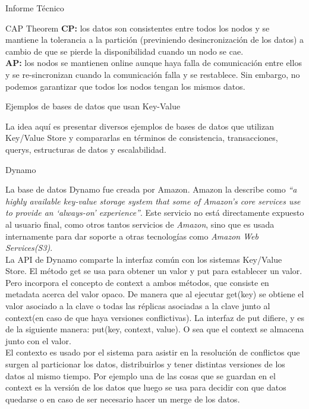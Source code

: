 \begin{section}{Informe T\'ecnico}
\begin{subsection}{CAP Theorem}
\textbf{CP:} los datos son consistentes entre todos los nodos y se mantiene la tolerancia a la partición (previniendo desincronización de los datos) a cambio de que se pierde la disponibilidad cuando un nodo se cae.\\

\textbf{AP:} los nodos se mantienen online aunque haya falla de comunicación entre ellos y se re-sincronizan cuando la comunicación falla y se restablece. Sin embargo, no podemos garantizar que todos los nodos tengan los mismos datos.\\

\end{subsection}
\end{section}

\pagebreak

\begin{section}{Ejemplos de bases de datos que usan Key-Value}

La idea aquí es presentar diversos ejemplos de bases de datos que utilizan Key/Value Store y compararlas en términos de consistencia, transacciones, querys, estructuras de datos y escalabilidad.

\begin{subsection}{Dynamo}
	
La base de datos Dynamo fue creada por Amazon. Amazon la describe como \textit{“a highly available key-value storage system that some of Amazon’s core services use to provide an ‘always-on’ experience”}. Este servicio no está directamente expuesto al usuario final, como otros tantos servicios de \textit{Amazon}, sino que es usada internamente para dar soporte a otras tecnologías como \textit{Amazon Web Services(S3)}. \\

La API de Dynamo comparte la interfaz común con los sistemas Key/Value Store. El método get se usa para obtener un valor y put para establecer un valor. Pero incorpora el concepto de context a ambos métodos, que consiste en metadata acerca del valor opaco. De manera que al ejecutar get(key) se obtiene el valor asociado a la clave o todas las réplicas asociadas a la clave junto al context(en caso de que haya versiones conflictivas). La interfaz de put difiere, y es de la siguiente manera: put(key, context, value). O sea que el context se almacena junto con el valor. \\

	El contexto es usado por el sistema para asistir en la resolución de conflictos que surgen al particionar los datos, distribuirlos y tener distintas versiones de los datos al mismo tiempo. Por ejemplo una de las cosas que se guardan en el context es la versión de los datos que luego se usa para decidir con que datos quedarse o en caso de ser necesario hacer un merge de los datos.


\end{subsection}
\end{section}
